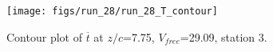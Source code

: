 \begin{figure}[H]
\centering
\texttt{[image: figs/run\_28/run\_28\_T\_contour]}
\caption{Contour plot of $\overline{t}$ at $z/c$=7.75, $V_{free}$=29.09, station 3.}
\label{fig:run_28_T_contour}
\end{figure}


